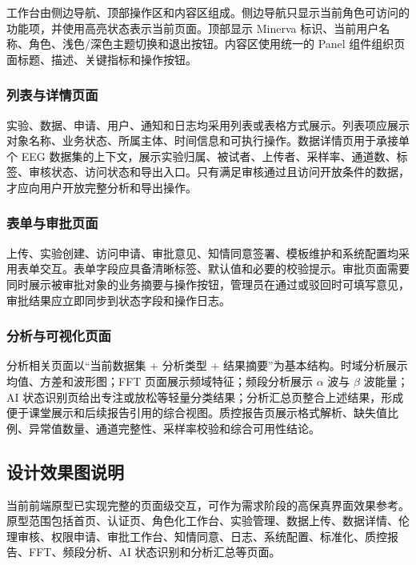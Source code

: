 工作台由侧边导航、顶部操作区和内容区组成。侧边导航只显示当前角色可访问的功能项，并使用高亮状态表示当前页面。顶部显示 Minerva 标识、当前用户名称、角色、浅色/深色主题切换和退出按钮。内容区使用统一的 Panel 组件组织页面标题、描述、关键指标和操作按钮。

\subsubsection{列表与详情页面}

实验、数据、申请、用户、通知和日志均采用列表或表格方式展示。列表项应展示对象名称、业务状态、所属主体、时间信息和可执行操作。数据详情页用于承接单个 EEG 数据集的上下文，展示实验归属、被试者、上传者、采样率、通道数、标签、审核状态、访问状态和导出入口。只有满足审核通过且访问开放条件的数据，才应向用户开放完整分析和导出操作。

\subsubsection{表单与审批页面}

上传、实验创建、访问申请、审批意见、知情同意签署、模板维护和系统配置均采用表单交互。表单字段应具备清晰标签、默认值和必要的校验提示。审批页面需要同时展示被审批对象的业务摘要与操作按钮，管理员在通过或驳回时可填写意见，审批结果应立即同步到状态字段和操作日志。

\subsubsection{分析与可视化页面}

分析相关页面以``当前数据集 + 分析类型 + 结果摘要''为基本结构。时域分析展示均值、方差和波形图；FFT 页面展示频域特征；频段分析展示 $\alpha$ 波与 $\beta$ 波能量；AI 状态识别页给出专注或放松等轻量分类结果；分析汇总页整合上述结果，形成便于课堂展示和后续报告引用的综合视图。质控报告页展示格式解析、缺失值比例、异常值数量、通道完整性、采样率校验和综合可用性结论。

\subsection{设计效果图说明}

当前前端原型已实现完整的页面级交互，可作为需求阶段的高保真界面效果参考。原型范围包括首页、认证页、角色化工作台、实验管理、数据上传、数据详情、伦理审核、权限申请、审批工作台、知情同意、日志、系统配置、标准化、质控报告、FFT、频段分析、AI 状态识别和分析汇总等页面。

